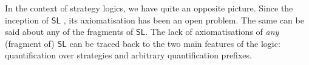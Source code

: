 \documentclass{article}
\newtheorem{definition}{Definition}
\begin{document}
In the context of strategy logics, we have quite an opposite picture. Since the inception of $\mathsf{SL}$ \cite{mogavero10}, its axiomatisation has been an open problem. The same can be said about any of the fragments of $\mathsf{SL}$. %
The lack of axiomatisations of \textit{any} (fragment of) $\mathsf{SL}$ can be traced back to the two main features of the logic: quantification over strategies and arbitrary quantification prefixes. %


\end{document}
